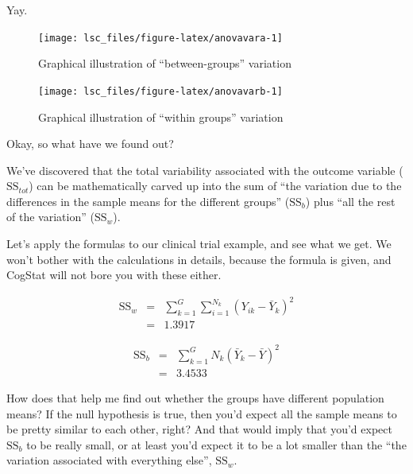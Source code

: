 \documentclass[
]{book}
\theoremstyle{definition}
\theoremstyle{definition}
\theoremstyle{definition}
\theoremstyle{definition}
\theoremstyle{remark}
\begin{document}
Yay.



\begin{figure}

{\centering \texttt{[image: lsc\_files/figure-latex/anovavara-1]} 

}

\caption{Graphical illustration of ``between-groups'' variation}\label{fig:anovavara}
\end{figure}



\begin{figure}

{\centering \texttt{[image: lsc\_files/figure-latex/anovavarb-1]} 

}

\caption{Graphical illustration of ``within groups'' variation}\label{fig:anovavarb}
\end{figure}

Okay, so what have we found out?

We've discovered that the total variability associated with the outcome variable (\(\mbox{SS}_ {tot}\)) can be mathematically carved up into the sum of ``the variation due to the differences in the sample means for the different groups'' (\(\mbox{SS}_ {b}\)) plus ``all the rest of the variation'' (\(\mbox{SS}_ {w}\)).

Let's apply the formulas to our clinical trial example, and see what we get. We won't bother with the calculations in details, because the formula is given, and CogStat will not bore you with these either.

\[
\begin{array}{rcl}
\mbox{SS}_w &=& \sum_{k=1}^G \sum_{i=1}^{N_k} \left( Y_{ik} - \bar{Y}_k \right)^2
    \\
        &=& 1.3917
\end{array}
\]

\[
\begin{array}{rcl}
\mbox{SS}_b &=& \sum_{k=1}^G N_k \left( \bar{Y}_k - \bar{Y} \right)^2
    \\
        &=& 3.4533
\end{array}
\]

How does that help me find out whether the groups have different population means? If the null hypothesis is true, then you'd expect all the sample means to be pretty similar to each other, right? And that would imply that you'd expect \(\mbox{SS}_ {b}\) to be really small, or at least you'd expect it to be a lot smaller than the ``the variation associated with everything else'', \(\mbox{SS}_{w}\).
\end{document}
